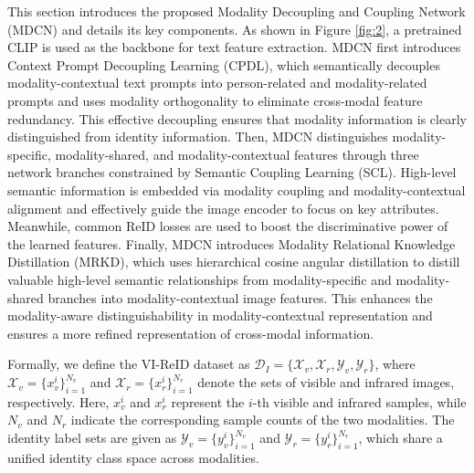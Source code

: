 This section introduces the proposed Modality Decoupling and Coupling Network (MDCN) and details its key components. As shown in Figure \ref{fig:2}, a pretrained CLIP \cite{CLIP_2021} is used as the backbone for text feature extraction. MDCN first introduces Context Prompt Decoupling Learning (CPDL), which semantically decouples modality-contextual text prompts into person-related and modality-related prompts and uses modality orthogonality to eliminate cross-modal feature redundancy. This effective decoupling ensures that modality information is clearly distinguished from identity information. Then, MDCN distinguishes modality-specific, modality-shared, and modality-contextual features through three network branches constrained by Semantic Coupling Learning (SCL). High-level semantic information is embedded via modality coupling and modality-contextual alignment and effectively guide the image encoder to focus on key attributes. Meanwhile, common ReID losses are used to boost the discriminative power of the learned features. Finally, MDCN introduces Modality Relational Knowledge Distillation (MRKD), which uses hierarchical cosine angular distillation to distill valuable high-level semantic relationships from modality-specific and modality-shared branches into modality-contextual image features. This enhances the modality-aware distinguishability in modality-contextual representation and ensures a more refined representation of cross-modal information.

Formally, we define the VI-ReID dataset as 
$\mathcal{D}_I = \{\mathcal{X}_v, \mathcal{X}_r, \mathcal{Y}_v, \mathcal{Y}_r\}$,  
where $\mathcal{X}_v = \{x_v^i\}_{i=1}^{N_v}$ and $\mathcal{X}_r = \{x_r^i\}_{i=1}^{N_r}$ denote the sets of visible and infrared images, respectively. Here, $x_v^i$ and $x_r^i$ represent the $i$-th visible and infrared samples, while $N_v$ and $N_r$ indicate the corresponding sample counts of the two modalities. The identity label sets are given as $\mathcal{Y}_v = \{y_v^i\}_{i=1}^{N_v}$ and $\mathcal{Y}_r = \{y_r^i\}_{i=1}^{N_r}$, which share a unified identity class space across modalities. 



